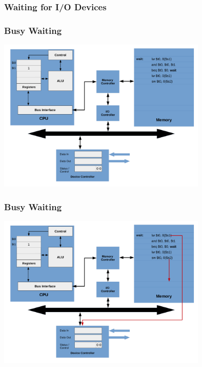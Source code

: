 \documentclass{beamer}
\begin{document}
\begin{frame}%
\frametitle{Waiting for I/O Devices}

\end{frame}

\begin{frame}%
\frametitle{Busy Waiting}

\vspace*{-0.2cm}
\begin{center}
\hspace*{-1cm}\includegraphics[width=10cm]{busy_waiting1.pdf}
\end{center}

\end{frame}

\begin{frame}%
\frametitle{Busy Waiting}

\vspace*{-0.2cm}
\begin{center}
\hspace*{-1cm}\includegraphics[width=10cm]{busy_waiting2.pdf}
\end{center}

\end{frame}
\end{document}
